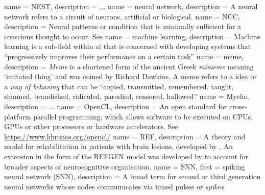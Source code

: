  {
  name = NEST,
  description = {...}
}
 {
  name = {neural network},
  description = {A neural network refers to a circuit of neurons, artificial or biological.}
}
 {
   name = {NCC},
   description = {Neural patterns or condition that is minimally sufficient for a conscious
thought to occur. See \autocite{atkinson2000, Hohwy2009}}
}
 {
  name = machine learning,
  description = {Machine learning is a sub-field within \gls{ai} that is concerned
    with developing systems that ``progressively improves their performance on a
    certain task'' \autocite{wiki:ml}}
}
 {
name = meme,
description = {\textit{Meme} is a shortened form of the ancient Greek \textit{mimeme} meaning
`imitated thing' and was coined by Richard Dawkins. A meme refers to a idea or a
\textit{way of behaving} that can be \enquote{copied, transmitted, remembered, taught, shunned,
brandished, ridiculed, parodied, censored, hallowed} \autocite{dennett2017}}
}
 {
  name = Myelin,
  description = {...}
}
 {
   name = {OpenCL},
   description = {An open standard for cross-platform parallel programming, which
   allows software to be executed on CPUs, GPUs or other processors or hardware accelerators. See \url{
   https://www.khronos.org/opencl/}}
}
 {
  name = REF,
  description = {A theory and model for rehabilitation in patients
  with brain lesions, developed by \cite{Mogensen2011}.
  An extension in the form of the REFGEN model was developed by
  \textcite{Mogensen2017} to account for broader aspects of
  neurocognitive organisation.}
}
 {
  name = SNN,
  first = {spiking neural network (SNN)},
  description = {A broad term for second or third generation neural
                 networks whose nodes communicates via timed pulses or
		 \textit{spikes}}
}
